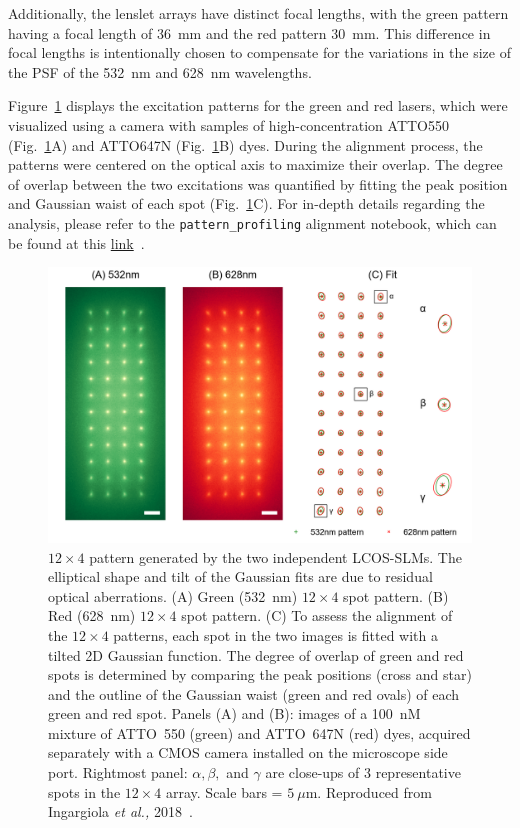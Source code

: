 Additionally, the lenslet arrays have distinct focal lengths, with the green pattern having a focal length of 36~mm and the red pattern 30~mm. 
This difference in focal lengths is intentionally chosen to compensate for the variations in the size of the \ac{PSF} of the 532~nm and 628~nm wavelengths.

Figure~\ref{fig:pattern_profile} displays the excitation patterns for the green and red lasers, which were visualized using a camera with samples of high-concentration ATTO550 (Fig.~\ref{fig:pattern_profile}A) and ATTO647N (Fig.~\ref{fig:pattern_profile}B) dyes. 
During the alignment process, the patterns were centered on the optical axis to maximize their overlap.
The degree of overlap between the two excitations was quantified by fitting the peak position and Gaussian waist of each spot (Fig.~\ref{fig:pattern_profile}C). 
For in-depth details regarding the analysis, please refer to the \texttt{pattern\_profiling} alignment notebook, which can be found at this \href{https://github.com/tritemio/48-spot-smFRET-PAX-analysis/tree/master/alignment}{link}~\cite{ingargiola_JCP_2018}.

\begin{figure}
\centering
\includegraphics[width=1.0\linewidth]{chapters/figures/2017-04-28_conf9_G_conf14_R_green_red_pattern_and_fit.png}
\caption{\label{fig:pattern_profile} $12\times4$ pattern generated by the two independent \ac{LCOS-SLM}s. 
The elliptical shape and tilt of the Gaussian fits are due to residual optical aberrations. 
(A) Green (532~nm) $12\times4$ spot pattern. 
(B) Red (628~nm) $12\times4$ spot pattern. 
(C) To assess the alignment of the $12\times4$ patterns, each spot in the two images is fitted  with a tilted 2D Gaussian function. 
The degree of overlap of green and red spots is determined by comparing the peak positions (cross and star) and the outline of the Gaussian waist (green and red ovals) of each green and red spot. 
Panels (A) and (B): images of a 100~nM mixture of ATTO~550 (green) and ATTO~647N (red) dyes, acquired separately with a CMOS camera installed on the microscope side port. 
Rightmost panel: $\alpha, \beta,$ and $\gamma$ are close-ups of 3 representative spots in the $12\times4$ array. 
Scale bars = $5~\mu$m. 
Reproduced from Ingargiola \textit{et al.,} 2018~\cite{ingargiola_JCP_2018}.
}
\end{figure}

